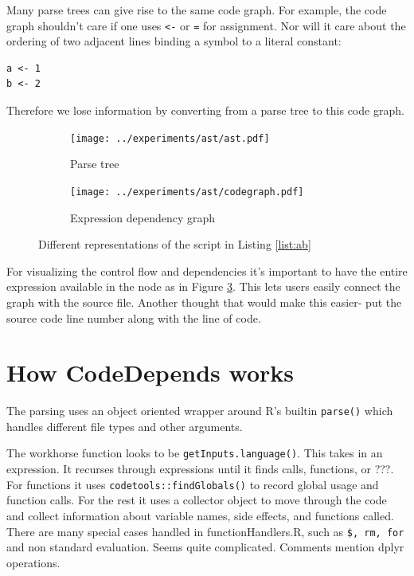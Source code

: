 \documentclass[12pt]{article}
\begin{document}
Many parse trees can give rise to the same code graph. For
example, the code graph shouldn't care if one uses \texttt{<-} or
\texttt{=} for assignment. Nor will it care about the ordering of two
adjacent lines binding a symbol to a literal constant:

\begin{verbatim}
a <- 1
b <- 2
\end{verbatim}

Therefore we lose information by converting from a parse tree to this code
graph.



\begin{figure}
\centering
\begin{subfigure}{.6\textwidth}
    \centering
    \texttt{[image: ../experiments/ast/ast.pdf]}
    \caption{Parse tree}
    \label{fig:ast}
\end{subfigure}%
\begin{subfigure}{.4\textwidth}
  \centering
  \texttt{[image: ../experiments/ast/codegraph.pdf]}
  \caption{Expression dependency graph}
  \label{fig:codegraph}
\end{subfigure}
\caption{Different representations of the script in Listing \ref{list:ab}}
\end{figure}

For visualizing the control flow and dependencies it's important to have the entire
expression available in the node as in Figure \ref{fig:codegraph}. This
lets users easily connect the graph with the source file. Another thought
that would make this easier- put the source code line number along with the
line of code.


\section{How CodeDepends works}

The parsing uses an object oriented wrapper around R's builtin \texttt{parse()}
which handles different file types and other arguments.

The workhorse function looks to be \texttt{getInputs.language()}. This
takes in an expression. It recurses through expressions until it finds
calls, functions, or ???.
For functions it uses
\texttt{codetools::findGlobals()} to record global usage and function
calls.
For the rest it uses a collector object to move through the code and
collect information about variable names, side effects, and functions
called. There are many special cases handled in functionHandlers.R, such as
\texttt{\$, rm, for} and non standard evaluation. Seems quite complicated.
Comments mention dplyr operations.
\end{document}
